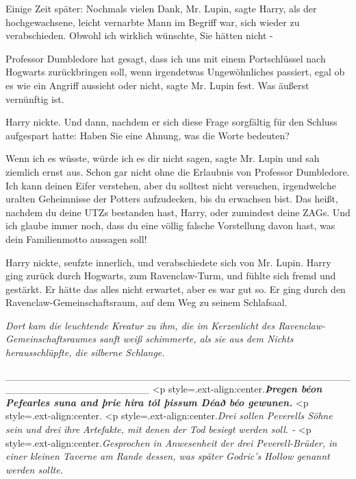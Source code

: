 Einige Zeit später: \glqq{}Nochmals vielen Dank, Mr. Lupin\grqq{}, sagte Harry,
als der hochgewachsene, leicht vernarbte Mann im Begriff war, sich wieder zu
verabschieden. \glqq{}Obwohl ich wirklich wünschte, Sie hätten nicht -\grqq{}

\glqq{}Professor Dumbledore hat gesagt, dass ich uns mit einem Portschlüssel nach
Hogwarts zurückbringen soll, wenn irgendetwas Ungewöhnliches passiert, egal ob
es wie ein Angriff aussieht oder nicht\grqq{}, sagte Mr. Lupin fest. \glqq{}Was
äußerst vernünftig ist.\grqq{}

Harry nickte. Und dann, nachdem er sich diese Frage sorgfältig für den Schluss
aufgespart hatte: \glqq{}Haben Sie eine Ahnung, was die Worte bedeuten?\grqq{}

\glqq{}Wenn ich es wüsste, würde ich es dir nicht sagen\grqq{}, sagte Mr. Lupin
und sah ziemlich ernst aus. \glqq{}Schon gar nicht ohne die Erlaubnis von
Professor Dumbledore. Ich kann deinen Eifer verstehen, aber du solltest nicht
versuchen, irgendwelche uralten Geheimnisse der Potters aufzudecken, bis du
erwachsen bist. Das heißt, nachdem du deine UTZs bestanden hast, Harry, oder
zumindest deine ZAGs. Und ich glaube immer noch, dass du eine völlig falsche
Vorstellung davon hast, was dein Familienmotto aussagen soll!\grqq{}

Harry nickte, seufzte innerlich, und verabschiedete sich von Mr. Lupin. Harry
ging zurück durch Hogwarts, zum Ravenclaw-Turm, und fühlte sich fremd und
gestärkt. Er hätte das alles nicht erwartet, aber es war gut so. Er ging durch
den Ravenclaw-Gemeinschaftsraum, auf dem Weg zu seinem Schlafsaal.

\emph{Dort kam die leuchtende Kreatur zu ihm, die im Kerzenlicht des
Ravenclaw-Gemeinschaftsraumes sanft weiß schimmerte, als sie aus dem Nichts
herausschlüpfte, die silberne Schlange.}

____________________________________________________________________ <p
style=\grqq{}.ext-align:center\grqq{}.\emph{\textbf{\emph{Þregen béon Pefearles
suna and þrie hira tól þissum Déað béo gewunen.}}} \textbf{\emph{} } <p
style=\grqq{}.ext-align:center\grqq{}.  <p
style=\grqq{}.ext-align:center\grqq{}.\emph{Drei sollen Peverells Söhne sein und
drei ihre Artefakte, mit denen der Tod besiegt werden soll. -}   <p
style=\grqq{}.ext-align:center\grqq{}.\emph{Gesprochen in Anwesenheit der drei
Peverell-Brüder, in einer kleinen Taverne am Rande dessen, was später Godric's
Hollow genannt werden sollte.}

